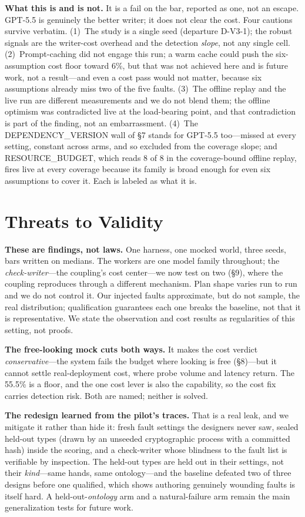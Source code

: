 \documentclass[acmsmall,screen]{acmart}
\begin{document}
\textbf{What this is and is not.} It is a fail on the bar, reported as one, not an
escape. GPT-5.5 is genuinely the better writer; it does not clear the cost. Four
cautions survive verbatim. (1)~The study is a single seed (departure D-V3-1); the
robust signals are the writer-cost overhead and the detection \emph{slope}, not
any single cell. (2)~Prompt-caching did not engage this run; a warm cache could
push the six-assumption cost floor toward 6\%, but that was not achieved here and
is future work, not a result---and even a cost pass would not matter, because six
assumptions already miss two of the five faults. (3)~The offline replay and the
live run are different measurements and we do not blend them; the offline optimism
was contradicted live at the load-bearing point, and that contradiction is part
of the finding, not an embarrassment. (4)~The DEPENDENCY\_VERSION wall of \S7
stands for GPT-5.5 too---missed at every setting, constant across arms, and so
excluded from the coverage slope; and RESOURCE\_BUDGET, which reads 8 of 8 in the
coverage-bound offline replay, fires live at every coverage because its family is
broad enough for even six assumptions to cover it. Each is labeled as what it is.

\section{Threats to Validity}
\textbf{These are findings, not laws.} One harness, one mocked world, three
seeds, bars written on medians. The workers are one model family throughout; the
\emph{check-writer}---the coupling's cost center---we now test on two (\S9), where
the coupling reproduces through a different mechanism. Plan shape varies run to
run and we do not control it. Our injected faults approximate, but do not sample, the real
distribution; qualification guarantees each one breaks the baseline, not that it
is representative. We state the observation and cost results as regularities of
this setting, not proofs.

\textbf{The free-looking mock cuts both ways.} It makes the cost verdict
\emph{conservative}---the system fails the budget where looking is free
(\S8)---but it cannot settle real-deployment cost, where probe volume and
latency return. The 55.5\% is a floor, and the one cost lever is also the
capability, so the cost fix carries detection risk. Both are named; neither is
solved.

\textbf{The redesign learned from the pilot's traces.} That is a real leak, and
we mitigate it rather than hide it: fresh fault settings the designers never
saw, sealed held-out types (drawn by an unseeded cryptographic process with a
committed hash) inside the scoring, and a check-writer whose blindness to the
fault list is verifiable by inspection. The held-out types are held out in their
settings, not their \emph{kind}---same hands, same ontology---and the baseline
defeated two of three designs before one qualified, which shows authoring
genuinely wounding faults is itself hard. A held-out-\emph{ontology} arm and a
natural-failure arm remain the main generalization tests for future work.
\end{document}
